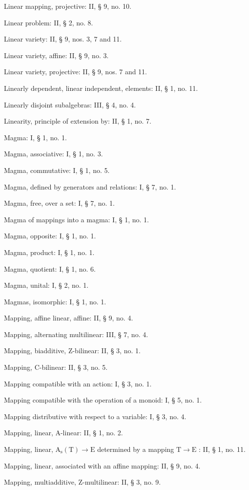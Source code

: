 Linear mapping, projective: II, § 9, no. 10.

Linear problem: II, § 2, no. 8.

Linear variety: II, § 9, nos. 3, 7 and 11.

Linear variety, affine: II, § 9, no. 3.

Linear variety, projective: II, § 9, nos. 7 and 11.

Linearly dependent, linear independent, elements: II, § 1, no. 11.

Linearly disjoint subalgebras: III, § 4, no. 4.

Linearity, principle of extension by: II, § 1, no. 7.

Magma: I, § 1, no. 1.

Magma, associative: I, § 1, no. 3.

Magma, commutative: I, § 1, no. 5.

Magma, defined by generators and relations: I, § 7, no. 1.

Magma, free, over a set: I, § 7, no. 1.

Magma of mappings into a magma: I, § 1, no. 1.

Magma, opposite: I, § 1, no. 1.

Magma, product: I, § 1, no. 1.

Magma, quotient: I, § 1, no. 6.

Magma, unital: I, § 2, no. 1.

Magmas, isomorphic: I, § 1, no. 1.

Mapping, affine linear, affine: II, § 9, no. 4.

Mapping, alternating multilinear: III, § 7, no. 4.

Mapping, biadditive, Z-bilinear: II, § 3, no. 1.

Mapping, C-bilinear: II, § 3, no. 5.

Mapping compatible with an action: I, § 3, no. 1.

Mapping compatible with the operation of a monoid: I, § 5, no. 1.

Mapping distributive with respect to a variable: I, § 3, no. 4.

Mapping, linear, A-linear: II, § 1, no. 2.

Mapping, linear, \(\mathrm{A_s(T)} \to \mathrm{E}\) determined by a mapping \(\mathrm{T} \to \mathrm{E}\) : II, § 1, no. 11.

Mapping, linear, associated with an affine mapping: II, § 9, no. 4.

Mapping, multiadditive, Z-multilinear: II, § 3, no. 9.

